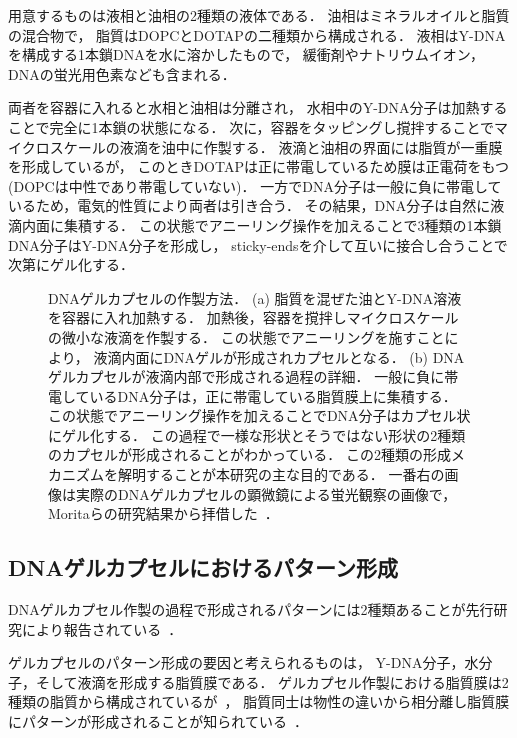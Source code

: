 用意するものは液相と油相の2種類の液体である．
油相はミネラルオイルと脂質の混合物で，
脂質はDOPCとDOTAPの二種類から構成される．
液相はY-DNAを構成する1本鎖DNAを水に溶かしたもので，
緩衝剤やナトリウムイオン，DNAの蛍光用色素なども含まれる．

両者を容器に入れると水相と油相は分離され，
水相中のY-DNA分子は加熱することで完全に1本鎖の状態になる．
次に，容器をタッピングし撹拌することでマイクロスケールの液滴を油中に作製する．
液滴と油相の界面には脂質が一重膜を形成しているが，
このときDOTAPは正に帯電しているため膜は正電荷をもつ(DOPCは中性であり帯電していない)．
一方でDNA分子は一般に負に帯電しているため，電気的性質により両者は引き合う．
その結果，DNA分子は自然に液滴内面に集積する．
この状態でアニーリング操作を加えることで3種類の1本鎖DNA分子はY-DNA分子を形成し，
sticky-endsを介して互いに接合し合うことで次第にゲル化する．

\begin{figure}
\centering

\caption{DNAゲルカプセルの作製方法．
    (a) 脂質を混ぜた油とY-DNA溶液を容器に入れ加熱する．
        加熱後，容器を撹拌しマイクロスケールの微小な液滴を作製する．
        この状態でアニーリングを施すことにより，
        液滴内面にDNAゲルが形成されカプセルとなる．
    (b) DNAゲルカプセルが液滴内部で形成される過程の詳細．
        一般に負に帯電しているDNA分子は，正に帯電している脂質膜上に集積する．
        この状態でアニーリング操作を加えることでDNA分子はカプセル状にゲル化する．
        この過程で一様な形状とそうではない形状の2種類のカプセルが形成されることがわかっている．
        この2種類の形成メカニズムを解明することが本研究の主な目的である．
        一番右の画像は実際のDNAゲルカプセルの顕微鏡による蛍光観察の画像で，
        Moritaらの研究結果から拝借した~\cite{moritasan}．
}

\label{fig:capsule}
\end{figure}


\subsection{DNAゲルカプセルにおけるパターン形成}

DNAゲルカプセル作製の過程で形成されるパターンには2種類あることが先行研究により報告されている~\cite{morita2017formation}．

ゲルカプセルのパターン形成の要因と考えられるものは，
Y-DNA分子，水分子，そして液滴を形成する脂質膜である．
ゲルカプセル作製における脂質膜は2種類の脂質から構成されているが~\cite{morita2017formation}，
脂質同士は物性の違いから相分離し脂質膜にパターンが形成されることが知られている~\cite{yanagisawa2014multiple}．

